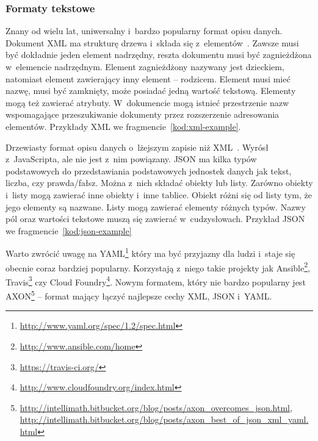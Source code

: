 \subsubsection{Formaty tekstowe}

\begin{description}
Znany od wielu lat, uniwersalny i~bardzo popularny format opisu danych. Dokument XML ma strukturę drzewa i~składa się z~elementów~\cite{xml-tutorial}. Zawsze musi być dokładnie jeden element nadrzędny, reszta dokumentu musi być zagnieżdżona w~elemencie nadrzędnym. Element zagnieżdżony nazywany jest dzieckiem, natomiast element zawierający inny element -- rodzicem. Element musi mieć nazwę, musi być zamknięty, może posiadać jedną wartość tekstową. Elementy mogą też zawierać atrybuty. W~dokumencie mogą istnieć przestrzenie nazw wspomagające przeszukiwanie dokumenty przez rozszerzenie adresowania elementów. Przykłady XML we fragmencie~\ref{kod:xml-example}.

Drzewiasty format opisu danych o~lżejszym zapisie niż XML~\cite{json-tutorial}. Wyrósł z~JavaScripta, ale nie jest z~nim powiązany. JSON ma kilka typów podstawowych do przedstawiania podstawowych jednostek danych jak tekst, liczba, czy prawda/fałsz. Można z~nich składać obiekty lub listy. Zarówno obiekty i~listy mogą zawierać inne obiekty i~inne tablice. Obiekt różni się od listy tym, że jego elementy są nazwane. Listy mogą zawierać elementy różnych typów. Nazwy pól oraz wartości tekstowe muszą się zawierać w~cudzysłowach. Przykład JSON we fragmencie~\ref{kod:json-example}

Warto zwrócić uwagę na YAML\footnote{\url{http://www.yaml.org/spec/1.2/spec.html}} który ma być przyjazny dla ludzi i~staje się obecnie coraz bardziej popularny. Korzystają z~niego takie projekty jak Ansible\footnote{\url{http://www.ansible.com/home}}, Travis\footnote{\url{https://travis-ci.org/}} czy Cloud Foundry\footnote{\url{http://www.cloudfoundry.org/index.html}}. 
Nowym formatem, który nie bardzo popularny jest AXON\footnote{\url{http://intellimath.bitbucket.org/blog/posts/axon_overcomes_json.html}, \url{http://intellimath.bitbucket.org/blog/posts/axon_best_of_json_xml_yaml.html}} -- format mający łączyć najlepsze cechy XML, JSON i~YAML.

\end{description}

